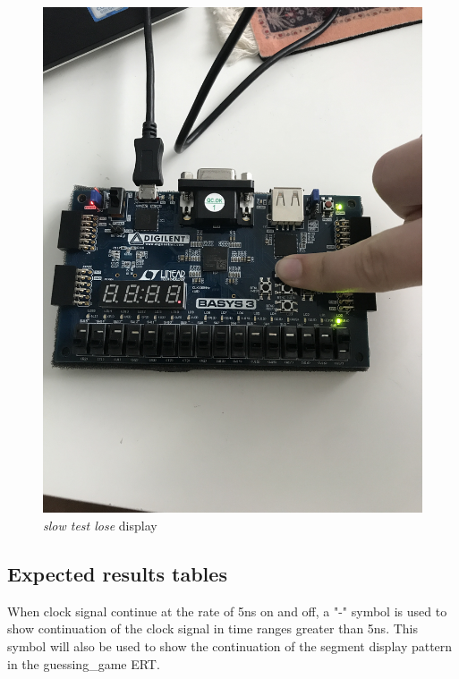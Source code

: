 \documentclass[11pt]{article}
\begin{document}
\begin{figure}[ht]\centering
	\includegraphics[angle = 270, width=1\textwidth]{slow2}
	\caption{\textit{slow test lose} display}
	\label{fig:sim_with_table}
\end{figure}



\clearpage
\subsection*{Expected results tables}

When clock signal continue at the rate of 5ns on and off, a "-" symbol is used to show continuation of the clock signal in time ranges greater than 5ns. This symbol will also be used to show the continuation of the segment display pattern in the guessing\_game ERT. 
 
\end{document}
